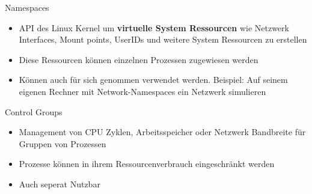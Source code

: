 \documentclass{beamer}
\begin{document}
  \begin{frame}{Namespaces}
    \begin{itemize}[<+->]
      \item API des Linux Kernel um \textbf{virtuelle System Ressourcen} wie Netzwerk Interfaces, Mount points, UserIDs und weitere System Ressourcen zu erstellen
      \item Diese Ressourcen können einzelnen Prozessen zugewiesen
werden
      \item Können auch für sich genommen verwendet werden. Beispiel: Auf seinem eigenen Rechner mit Network-Namespaces ein Netzwerk simulieren
    \end{itemize}
  \end{frame}
  
  \begin{frame}{Control Groups}
    \begin{itemize}[<+->]
      \item Management von CPU Zyklen, Arbeitsspeicher oder Netzwerk Bandbreite für Gruppen von Prozessen
      \item Prozesse können in ihrem Ressourcenverbrauch eingeschränkt werden
      \item Auch seperat Nutzbar
    \end{itemize}
  \end{frame}
  
\end{document}
